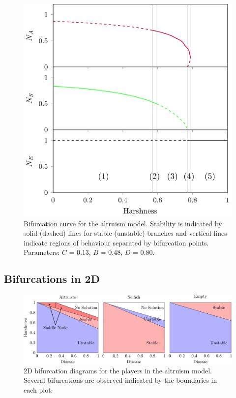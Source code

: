 \documentclass[11pt]{article}
\begin{document}
 
\begin{figure}[ht]
	\centering
	\includegraphics[width=0.8\linewidth]{AltruismD+H-H}	
	\caption{Bifurcation curve for the altruism model. Stability is 
	indicated by solid (dashed) lines for stable (unstable) branches 
	and vertical lines indicate regions of behaviour separated by bifurcation 
	points. Parameters: $C$ = 0.13, $B$ = 0.48, $D$ = 0.80.
	}
	\label{fig:altruistBifurcationH}
\end{figure}	




\subsection{Bifurcations in 2D}


 \begin{figure}[h]
	\centering
	\includegraphics[width=0.8\linewidth]{2DBifurcationsAgents}	
	\caption{2D bifurcation diagrams for the players in the altruism model. Several bifurcations are observed indicated by the boundaries in each plot.  
	\label{fig:2Dagents}}
\end{figure}	
\end{document}
